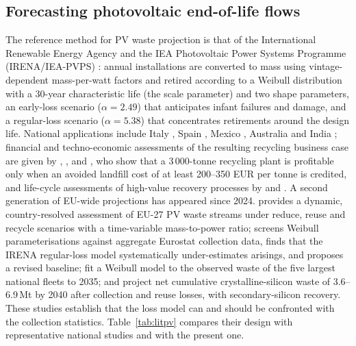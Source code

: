 \documentclass[a4paper,fleqn]{cas-sc}
\begin{document}
\subsection{Forecasting photovoltaic end-of-life flows}
The reference method for PV waste projection is that of the International Renewable Energy Agency and the IEA Photovoltaic Power Systems Programme (IRENA/IEA-PVPS) \citep{irena2016}: annual installations are converted to mass using vintage-dependent mass-per-watt factors and retired according to a Weibull distribution \citep{weibull1951} with a 30-year characteristic life (the scale parameter) and two shape parameters, an early-loss scenario ($\alpha=2.49$) that anticipates infant failures and damage, and a regular-loss scenario ($\alpha=5.38$) that concentrates retirements around the design life. National applications include Italy \citep{paiano2015}, Spain \citep{santos2018}, Mexico \citep{dominguez2017}, Australia \citep{mahmoudi2019} and India \citep{gautam2021}; financial and techno-economic assessments of the resulting recycling business case are given by \citet{cucchiella2015}, \citet{dadamo2017}, \citet{deng2019} and \citet{dadamo2023}, who show that a 3\,000-tonne recycling plant is profitable only when an avoided landfill cost of at least 200--350 EUR per tonne is credited, and life-cycle assessments of high-value recovery processes by \citet{latunussa2016} and \citet{ansanelli2021}. A second generation of EU-wide projections has appeared since 2024. \citet{kastanaki2025} provides a dynamic, country-resolved assessment of EU-27 PV waste streams under reduce, reuse and recycle scenarios with a time-variable mass-to-power ratio; \citet{kastanaki2026} screens Weibull parameterisations against aggregate Eurostat collection data, finds that the IRENA regular-loss model systematically under-estimates arisings, and proposes a revised baseline; \citet{pitacco2026} fit a Weibull model to the observed waste of the five largest national fleets to 2035; and \citet{nagarajan2026} project net cumulative crystalline-silicon waste of 3.6--6.9\,Mt by 2040 after collection and reuse losses, with secondary-silicon recovery. These studies establish that the loss model can and should be confronted with the collection statistics. Table~\ref{tab:litpv} compares their design with representative national studies and with the present one.
\end{document}
